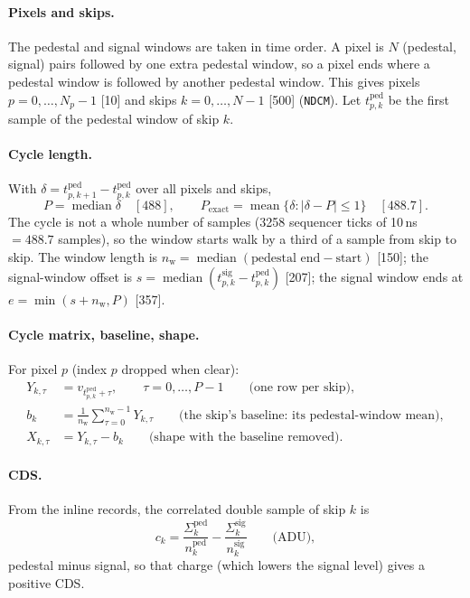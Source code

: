 \documentclass[10pt]{article}
\newcommand{\code}[1]{\texttt{#1}}
\newcommand{\med}{\operatorname*{median}}
\newcommand{\mean}{\operatorname*{mean}}
\newcommand{\nw}{n_\text{w}}
\begin{document}
\paragraph{Pixels and skips.} The pedestal and signal windows are taken in time order. A pixel is $N$ (pedestal, signal) pairs
followed by one extra pedestal window, so a pixel ends where a pedestal window is followed by another pedestal window. This gives pixels
$p = 0, \dots, N_p - 1$ [10] and skips $k = 0, \dots, N - 1$ [500] (\code{NDCM}). Let $t^\text{ped}_{p,k}$ be the first sample of
the pedestal window of skip $k$.

\paragraph{Cycle length.} With $\delta = t^\text{ped}_{p,k+1} - t^\text{ped}_{p,k}$ over all pixels and skips,
\begin{equation}
P = \med \delta \quad[488], \qquad P_\text{exact} = \mean\{\delta : |\delta - P| \le 1\} \quad[488.7].
\end{equation}
The cycle is not a whole number of samples (3258 sequencer ticks of 10\,ns $= 488.7$ samples), so the window starts walk by a third of a
sample from skip to skip. The window length is $\nw = \med(\text{pedestal end} - \text{start})$ [150]; the signal-window offset is
$s = \med(t^\text{sig}_{p,k} - t^\text{ped}_{p,k})$ [207]; the signal window ends at $e = \min(s + \nw, P)$ [357].

\paragraph{Cycle matrix, baseline, shape.} For pixel $p$ (index $p$ dropped when clear):
\begin{align}
Y_{k,\tau} &= v_{t^\text{ped}_{p,k} + \tau}, \qquad \tau = 0, \dots, P-1 \qquad\text{(one row per skip)},\\
b_k &= \frac{1}{\nw}\sum_{\tau=0}^{\nw-1} Y_{k,\tau} \qquad\text{(the skip's baseline: its pedestal-window mean)},\\
X_{k,\tau} &= Y_{k,\tau} - b_k \qquad\text{(shape with the baseline removed)}.
\end{align}

\paragraph{CDS.} From the inline records, the correlated double sample of skip $k$ is
\begin{equation}
c_k = \frac{\Sigma^\text{ped}_k}{n^\text{ped}_k} - \frac{\Sigma^\text{sig}_k}{n^\text{sig}_k}\qquad\text{(ADU)},
\end{equation}
pedestal minus signal, so that charge (which lowers the signal level) gives a positive CDS.
\end{document}

